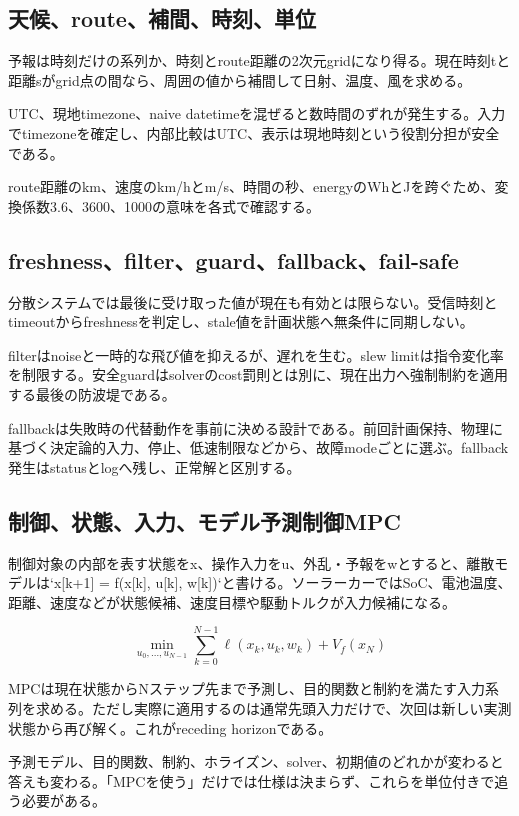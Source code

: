 \documentclass[a4paper,11pt]{article}
\begin{document}
\subsection{天候、route、補間、時刻、単位}
予報は時刻だけの系列か、時刻とroute距離の2次元gridになり得る。現在時刻tと距離sがgrid点の間なら、周囲の値から補間して日射、温度、風を求める。


UTC、現地timezone、naive datetimeを混ぜると数時間のずれが発生する。入力でtimezoneを確定し、内部比較はUTC、表示は現地時刻という役割分担が安全である。


route距離のkm、速度のkm/hとm/s、時間の秒、energyのWhとJを跨ぐため、変換係数3.6、3600、1000の意味を各式で確認する。



\subsection{freshness、filter、guard、fallback、fail-safe}
分散システムでは最後に受け取った値が現在も有効とは限らない。受信時刻とtimeoutからfreshnessを判定し、stale値を計画状態へ無条件に同期しない。


filterはnoiseと一時的な飛び値を抑えるが、遅れを生む。slew limitは指令変化率を制限する。安全guardはsolverのcost罰則とは別に、現在出力へ強制制約を適用する最後の防波堤である。


fallbackは失敗時の代替動作を事前に決める設計である。前回計画保持、物理に基づく決定論的入力、停止、低速制限などから、故障modeごとに選ぶ。fallback発生はstatusとlogへ残し、正常解と区別する。



\subsection{制御、状態、入力、モデル予測制御MPC}
制御対象の内部を表す状態をx、操作入力をu、外乱・予報をwとすると、離散モデルは`x[k+1] = f(x[k], u[k], w[k])`と書ける。ソーラーカーではSoC、電池温度、距離、速度などが状態候補、速度目標や駆動トルクが入力候補になる。


\[
\min_{u_0,\ldots,u_{N-1}} \sum_{k=0}^{N-1}\ell(x_k,u_k,w_k)+V_f(x_N)
\]

MPCは現在状態からNステップ先まで予測し、目的関数と制約を満たす入力系列を求める。ただし実際に適用するのは通常先頭入力だけで、次回は新しい実測状態から再び解く。これがreceding horizonである。


予測モデル、目的関数、制約、ホライズン、solver、初期値のどれかが変わると答えも変わる。「MPCを使う」だけでは仕様は決まらず、これらを単位付きで追う必要がある。
\end{document}
